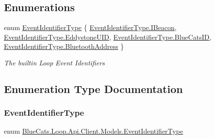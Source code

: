 \subsection*{Enumerations}
\begin{DoxyCompactItemize}
\item 
enum \mbox{\hyperlink{namespace_blue_cats_1_1_loop_1_1_api_1_1_client_1_1_models_a31a2ab154d0577f8b415d590bbee5d7c}{Event\+Identifier\+Type}} \{ \mbox{\hyperlink{namespace_blue_cats_1_1_loop_1_1_api_1_1_client_1_1_models_a31a2ab154d0577f8b415d590bbee5d7cac7c4b7517346c24a23158e6495b95d97}{Event\+Identifier\+Type.\+I\+Beacon}}, 
\mbox{\hyperlink{namespace_blue_cats_1_1_loop_1_1_api_1_1_client_1_1_models_a31a2ab154d0577f8b415d590bbee5d7cac08590d44a34bdf4a4912ce486ce93ed}{Event\+Identifier\+Type.\+Eddystone\+U\+ID}}, 
\mbox{\hyperlink{namespace_blue_cats_1_1_loop_1_1_api_1_1_client_1_1_models_a31a2ab154d0577f8b415d590bbee5d7ca77384541c74d884022662dcde37ec6c1}{Event\+Identifier\+Type.\+Blue\+Cats\+ID}}, 
\mbox{\hyperlink{namespace_blue_cats_1_1_loop_1_1_api_1_1_client_1_1_models_a31a2ab154d0577f8b415d590bbee5d7ca4b88af61387c7502c491c3c4c80076ae}{Event\+Identifier\+Type.\+Bluetooth\+Address}}
 \}
\begin{DoxyCompactList}\small\item\em The builtin Loop Event Identifiers \end{DoxyCompactList}\end{DoxyCompactItemize}


\subsection{Enumeration Type Documentation}
\mbox{\label{namespace_blue_cats_1_1_loop_1_1_api_1_1_client_1_1_models_a31a2ab154d0577f8b415d590bbee5d7c}} 
\subsubsection{\texorpdfstring{Event\+Identifier\+Type}{EventIdentifierType}}
{\footnotesize\ttfamily enum \mbox{\hyperlink{namespace_blue_cats_1_1_loop_1_1_api_1_1_client_1_1_models_a31a2ab154d0577f8b415d590bbee5d7c}{Blue\+Cats.\+Loop.\+Api.\+Client.\+Models.\+Event\+Identifier\+Type}}\hspace{0.3cm}{\ttfamily [strong]}}



